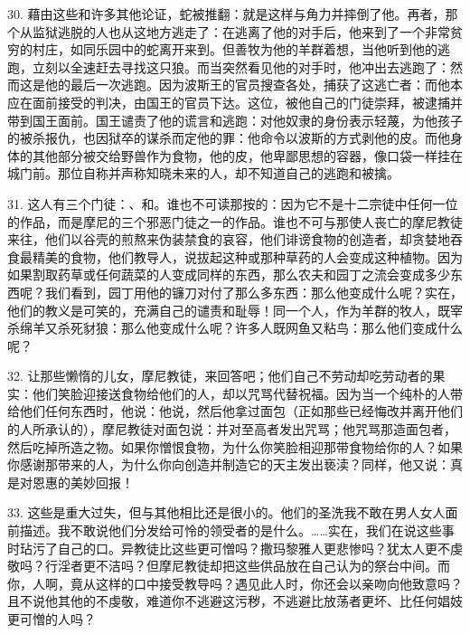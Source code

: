 30. 藉由这些和许多其他论证，蛇被推翻：就是这样与角力并摔倒了他。再者，那个从监狱逃脱的人也从这地方逃走了：在逃离了他的对手后，他来到了一个非常贫穷的村庄，如同乐园中的蛇离开来到。但善牧为他的羊群着想，当他听到他的逃跑，立刻以全速赶去寻找这只狼。而当突然看见他的对手时，他冲出去逃跑了：然而这是他的最后一次逃跑。因为波斯王的官员搜查各处，捕获了这逃亡者：而他本应在面前接受的判决，由国王的官员下达。这位，被他自己的门徒崇拜，被逮捕并带到国王面前。国王谴责了他的谎言和逃跑：对他奴隶的身份表示轻蔑，为他孩子的被杀报仇，也因狱卒的谋杀而定他的罪：他命令以波斯的方式剥他的皮。而他身体的其他部分被交给野兽作为食物，他的皮，他卑鄙思想的容器，像口袋一样挂在城门前。那位自称并声称知晓未来的人，却不知道自己的逃跑和被擒。\par

31. 这人有三个门徒：、和。谁也不可读那按的：因为它不是十二宗徒中任何一位的作品，而是摩尼的三个邪恶门徒之一的作品。谁也不可与那使人丧亡的摩尼教徒来往，他们以谷壳的煎熬来伪装禁食的哀容，他们诽谤食物的创造者，却贪婪地吞食最精美的食物，他们教导人，说拔起这种或那种草药的人会变成这种植物。因为如果割取药草或任何蔬菜的人变成同样的东西，那么农夫和园丁之流会变成多少东西呢？我们看到，园丁用他的镰刀对付了那么多东西：那么他变成什么呢？实在，他们的教义是可笑的，充满自己的谴责和耻辱！同一个人，作为羊群的牧人，既宰杀绵羊又杀死豺狼：那么他变成什么呢？许多人既网鱼又粘鸟：那么他们变成什么呢？\par

32. 让那些懒惰的儿女，摩尼教徒，来回答吧；他们自己不劳动却吃劳动者的果实：他们笑脸迎接送食物给他们的人，却以咒骂代替祝福。因为当一个纯朴的人带给他们任何东西时，他说：他说，然后他拿过面包（正如那些已经悔改并离开他们的人所承认的），摩尼教徒对面包说：并对至高者发出咒骂；他咒骂那造面包者，然后吃掉所造之物。如果你憎恨食物，为什么你笑脸相迎那带食物给你的人？如果你感谢那带来的人，为什么你向创造并制造它的天主发出亵渎？同样，他又说：真是对恩惠的美妙回报！\par

33. 这些是重大过失，但与其他相比还是很小的。他们的圣洗我不敢在男人女人面前描述。我不敢说他们分发给可怜的领受者的是什么。……实在，我们在说这些事时玷污了自己的口。异教徒比这些更可憎吗？撒玛黎雅人更悲惨吗？犹太人更不虔敬吗？行淫者更不洁吗？但摩尼教徒却把这些供品放在自己认为的祭台中间。而你，人啊，竟从这样的口中接受教导吗？遇见此人时，你还会以亲吻向他致意吗？且不说他其他的不虔敬，难道你不逃避这污秽，不逃避比放荡者更坏、比任何娼妓更可憎的人吗？\par

